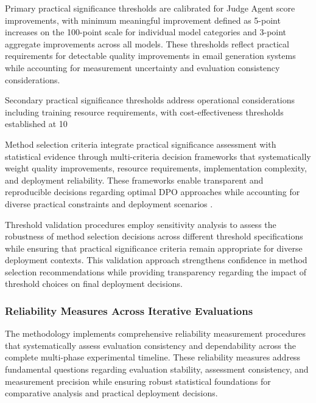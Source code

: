 Primary practical significance thresholds are calibrated for Judge Agent score improvements, with minimum meaningful improvement defined as 5-point increases on the 100-point scale for individual model categories and 3-point aggregate improvements across all models. These thresholds reflect practical requirements for detectable quality improvements in email generation systems while accounting for measurement uncertainty and evaluation consistency considerations.

Secondary practical significance thresholds address operational considerations including training resource requirements, with cost-effectiveness thresholds established at 10%

Method selection criteria integrate practical significance assessment with statistical evidence through multi-criteria decision frameworks that systematically weight quality improvements, resource requirements, implementation complexity, and deployment reliability. These frameworks enable transparent and reproducible decisions regarding optimal DPO approaches while accounting for diverse practical constraints and deployment scenarios \cite{wang2024human_ai_collaboration}.

Threshold validation procedures employ sensitivity analysis to assess the robustness of method selection decisions across different threshold specifications while ensuring that practical significance criteria remain appropriate for diverse deployment contexts. This validation approach strengthens confidence in method selection recommendations while providing transparency regarding the impact of threshold choices on final deployment decisions.

\subsubsection{Reliability Measures Across Iterative Evaluations}

The methodology implements comprehensive reliability measurement procedures that systematically assess evaluation consistency and dependability across the complete multi-phase experimental timeline. These reliability measures address fundamental questions regarding evaluation stability, assessment consistency, and measurement precision while ensuring robust statistical foundations for comparative analysis and practical deployment decisions.

